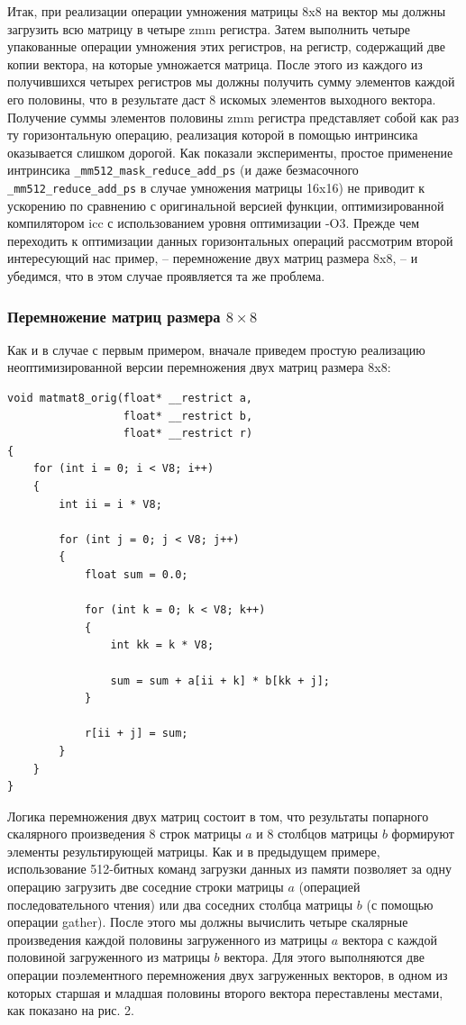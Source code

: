 Итак, при реализации операции умножения матрицы 8x8 на вектор мы должны загрузить всю матрицу в четыре zmm регистра.
Затем выполнить четыре упакованные операции умножения этих регистров, на регистр, содержащий две копии вектора, на которые умножается матрица.
После этого из каждого из получившихся четырех регистров мы должны получить сумму элементов каждой его половины, что в результате даст 8 искомых элементов выходного вектора.
Получение суммы элементов половины zmm регистра представляет собой как раз ту горизонтальную операцию, реализация которой в помощью интринсика оказывается слишком дорогой.
Как показали эксперименты, простое применение интринсика \texttt{\_mm512\_mask\_reduce\_add\_ps} (и даже безмасочного \texttt{\_mm512\_reduce\_add\_ps} в случае умножения матрицы 16x16) не приводит к ускорению по сравнению с оригинальной версией функции, оптимизированной компилятором icc с использованием уровня оптимизации -O3.
Прежде чем переходить к оптимизации данных горизонтальных операций рассмотрим второй интересующий нас пример, -- перемножение двух матриц размера 8x8, -- и убедимся, что в этом случае проявляется та же проблема.

\subsubsection{Перемножение матриц размера $8 \times 8$}

Как и в случае с первым примером, вначале приведем простую реализацию неоптимизированной версии перемножения двух матриц размера 8x8:

\begin{lstlisting}[caption={Невекторизованная версия перемножения матриц размера $8 \times 8$}, label={lst:text_4_small_matr_8x8_mul_matr_noopt}]
void matmat8_orig(float* __restrict a,
                  float* __restrict b,
                  float* __restrict r)
{
    for (int i = 0; i < V8; i++)
    {
        int ii = i * V8;
 
        for (int j = 0; j < V8; j++)
        {
            float sum = 0.0;

            for (int k = 0; k < V8; k++)
            {
                int kk = k * V8;
                
                sum = sum + a[ii + k] * b[kk + j];
            }

            r[ii + j] = sum;
        }
    }
}
\end{lstlisting}

Логика перемножения двух матриц состоит в том, что результаты попарного скалярного произведения 8 строк матрицы $a$ и 8 столбцов матрицы $b$ формируют элементы результирующей матрицы.
Как и в предыдущем примере, использование 512-битных команд загрузки данных из памяти позволяет за одну операцию загрузить две соседние строки матрицы $a$ (операцией последовательного чтения) или два соседних столбца матрицы $b$ (с помощью операции gather).
После этого мы должны вычислить четыре скалярные произведения каждой половины загруженного из матрицы $a$ вектора с каждой половиной загруженного из матрицы $b$ вектора.
Для этого выполняются две операции поэлементного перемножения двух загруженных векторов, в одном из которых старшая и младшая половины второго вектора переставлены местами, как показано на рис. 2.


